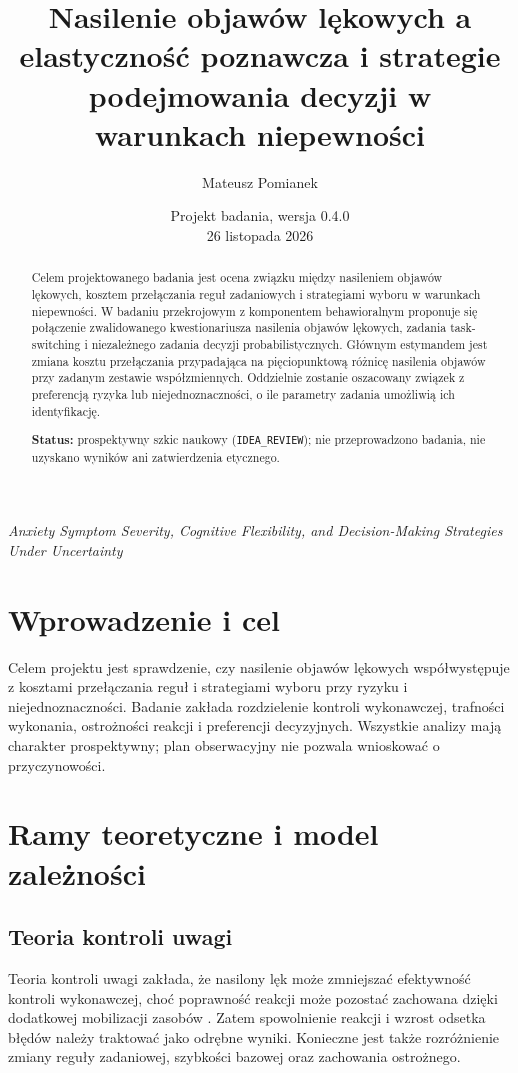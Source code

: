 \documentclass[11pt,a4paper]{article}
\title{Nasilenie objawów lękowych a elastyczność poznawcza i strategie podejmowania decyzji w warunkach niepewności}
\author{Mateusz Pomianek}
\date{Projekt badania, wersja 0.4.0 \\ 26 listopada 2026}
\begin{document}
\maketitle
\begin{center}
\textit{Anxiety Symptom Severity, Cognitive Flexibility, and Decision-Making Strategies Under Uncertainty}
\end{center}
\begin{abstract}
Celem projektowanego badania jest ocena związku między nasileniem objawów lękowych, kosztem przełączania reguł zadaniowych i strategiami wyboru w warunkach niepewności. W badaniu przekrojowym z komponentem behawioralnym proponuje się połączenie zwalidowanego kwestionariusza nasilenia objawów lękowych, zadania task-switching i niezależnego zadania decyzji probabilistycznych. Głównym estymandem jest zmiana kosztu przełączania przypadająca na pięciopunktową różnicę nasilenia objawów przy zadanym zestawie współzmiennych. Oddzielnie zostanie oszacowany związek z preferencją ryzyka lub niejednoznaczności, o ile parametry zadania umożliwią ich identyfikację.

\textbf{Status:} prospektywny szkic naukowy (\texttt{IDEA\_REVIEW}); nie przeprowadzono badania, nie uzyskano wyników ani zatwierdzenia etycznego.
\end{abstract}
\tableofcontents
\section{Wprowadzenie i cel}
Celem projektu jest sprawdzenie, czy nasilenie objawów lękowych współwystępuje z kosztami przełączania reguł i strategiami wyboru przy ryzyku i niejednoznaczności. Badanie zakłada rozdzielenie kontroli wykonawczej, trafności wykonania, ostrożności reakcji i preferencji decyzyjnych. Wszystkie analizy mają charakter prospektywny; plan obserwacyjny nie pozwala wnioskować o przyczynowości.

\section{Ramy teoretyczne i model zależności}
\subsection{Teoria kontroli uwagi}
Teoria kontroli uwagi zakłada, że nasilony lęk może zmniejszać efektywność kontroli wykonawczej, choć poprawność reakcji może pozostać zachowana dzięki dodatkowej mobilizacji zasobów \cite{Eysenck2007}. Zatem spowolnienie reakcji i wzrost odsetka błędów należy traktować jako odrębne wyniki. Konieczne jest także rozróżnienie zmiany reguły zadaniowej, szybkości bazowej oraz zachowania ostrożnego.
\end{document}
